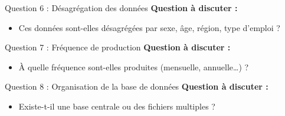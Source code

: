 \documentclass{beamer}
\begin{document}
\begin{frame}{Question 6 : Désagrégation des données}
\pause
\textbf{Question à discuter :}
\begin{itemize}
  \item Ces données sont-elles désagrégées par sexe, âge, région, type d’emploi ?
\end{itemize}
\end{frame}

\begin{frame}{Question 7 : Fréquence de production}
\pause
\textbf{Question à discuter :}
\begin{itemize}
  \item À quelle fréquence sont-elles produites (mensuelle, annuelle…) ?
\end{itemize}
\end{frame}

\begin{frame}{Question 8 : Organisation de la base de données}
\pause
\textbf{Question à discuter :}
\begin{itemize}
  \item Existe-t-il une base centrale ou des fichiers multiples ?
\end{itemize}
\end{frame}
\end{document}
